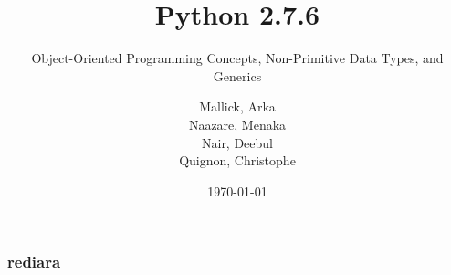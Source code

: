 \documentclass{beamer}
\begin{document}
\title{Python 2.7.6}
\subtitle{Object-Oriented Programming Concepts, Non-Primitive Data Types, and Generics}
\author{
  Mallick, Arka\\
  Naazare, Menaka \\
  Nair, Deebul\\
  Quignon, Christophe \\
} 
\date{\today}

\begin{frame}
\titlepage
\end{frame}

%
%
%
%
%

\begin{frame}[fragile]
\frametitle{rediara}
\framesubtitle{}

\end{frame}


\end{document}
